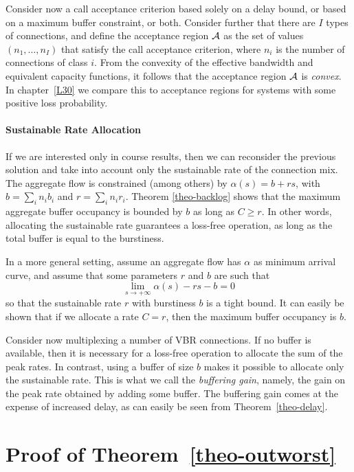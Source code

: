 Consider now a call acceptance criterion based solely on a delay
bound, or based on a maximum buffer constraint, or both. Consider
further that there are $I$ types of connections, and define the
acceptance region $\cal{A}$ as the set of values
$(n_{1},\ldots,n_{I})$ that satisfy the call acceptance criterion,
where $n_{i}$ is the number of connections of class $i$. From the
convexity of the effective bandwidth and equivalent capacity
functions, it follows that the acceptance region $\cal{A}$ is
\emph{convex}. In chapter~\ref{L30} we compare this to acceptance
regions for systems with some positive loss probability.


\paragraph{Sustainable Rate Allocation}

If we are interested only in course results, then we can
reconsider the previous solution and take into account only the
sustainable rate of the connection mix. The aggregate flow is
constrained (among others) by $\alpha(s) = b + rs$, with
$b=\sum_{i}n_i b_{i}$ and $r=\sum_{i}n_{i}r_i$. Theorem
\ref{theo-backlog} shows that the maximum aggregate buffer
occupancy is bounded by $b$ as long as $C \geq r$. In other words,
allocating the sustainable rate guarantees a loss-free operation,
as long as the total buffer is equal to the burstiness.

In a more general setting, assume an aggregate flow has $\alpha$
as minimum arrival curve, and assume that some parameters $r$ and
$b$ are such that
    $$\lim_{s \rightarrow + \infty} \alpha(s) - rs - b = 0
    $$
so that the sustainable rate $r$ with burstiness $b$ is a tight
bound. It can easily be shown that if we allocate a rate $C=r$,
then the maximum buffer occupancy is $b$.


Consider now multiplexing a number of VBR connections. If no
buffer is available, then it is necessary for a loss-free
operation to allocate the sum of the peak rates. In contrast,
using a buffer of size $b$ makes it possible to allocate only the
sustainable rate. This is what we call the \emph{buffering gain},
namely, the gain on the peak rate obtained by adding some buffer.
The buffering gain comes at the expense of increased delay, as can
easily be seen from Theorem~\ref{theo-delay}.

\section{Proof of Theorem~\ref{theo-outworst}}
